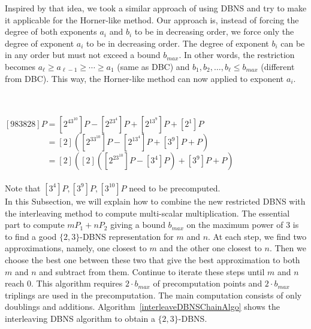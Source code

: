 Inspired by that idea, we took a similar approach of using DBNS and try to make it applicable for the Horner-like method.
Our approach is, instead of forcing the degree of both exponents $a_i$ and $b_i$ to be in decreasing order,
we force only the degree of exponent $a_i$ to be in decreasing order.
The degree of exponent $b_i$ can be in any order but must not exceed a bound $b_{max}$.
In other words, the restriction becomes
$a_\ell \ge a_{\ell-1} \ge \cdots \ge a_1$ (same as DBC) and $b_1,b_2,\dots,b_\ell \le b_{max}$ (different from DBC).
This way, the Horner-like method can now applied to exponent $a_i$.

 \\
\\
$[983828]P = [2^43^{10}]P - [2^23^4]P + [2^13^9]P + [2^1]P$ \\
$\phantom{[983828]P} = [2]([2^33^{10}]P - [2^13^4]P + [3^9]P + P)$ \\
$\phantom{[983828]P} = [2]([2]([2^23^{10}]P - [3^4]P) + [3^9]P + P)$ \\
\\
Note that $[3^4]P, [3^9]P, [3^{10}]P$ need to be precomputed. \\

In this Subsection, we will explain how to combine the new restricted DBNS with the interleaving method to compute multi-scalar multiplication.
The essential part to compute $mP_1 + nP_2$ giving a bound $b_{max}$ on the maximum power of 3
is to find a good $\{2,3\}$-DBNS representation for $m$ and $n$.
At each step, we find two approximations, namely, one closest to $m$ and the other one closest to $n$.
Then we choose the best one between these two that give the best approximation to both $m$ and $n$ and subtract from them.
Continue to iterate these steps until $m$ and $n$ reach $0$.
This algorithm requires $2 \cdot b_{max}$ of precomputation points and $2 \cdot b_{max}$ triplings are used in the precomputation.
The main computation consists of only doublings and additions.
Algorithm~\ref{interleaveDBNSChainAlgo} shows the interleaving DBNS algorithm to obtain a $\{2,3\}$-DBNS.

